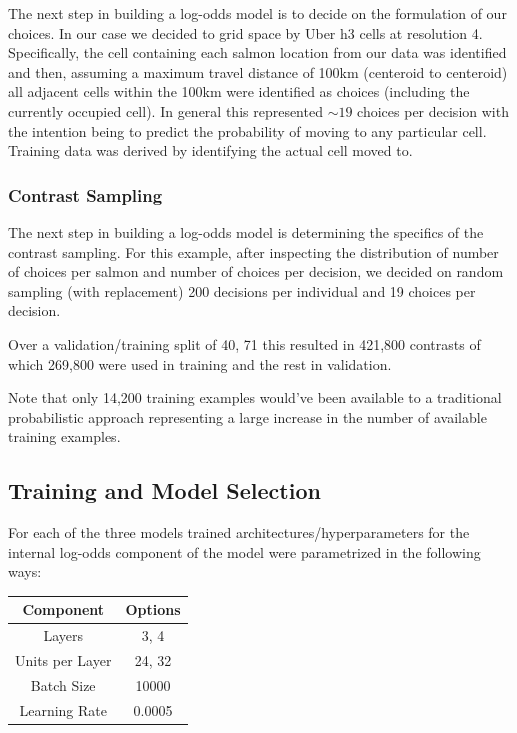 \documentclass[11pt]{article}
\begin{document}
The next step in building a log-odds model is to decide on the formulation of our choices. In our case we decided to grid space by Uber h3 cells at resolution 4. Specifically, the cell containing each salmon location from our data was identified and then, assuming a maximum travel distance of 100km (centeroid to centeroid) all adjacent cells within the 100km were identified as choices (including the currently occupied cell). In general this represented $\sim 19$ choices per decision with the intention being to predict the probability of moving to any particular cell. Training data was derived by identifying the actual cell moved to. 

\subsubsection*{Contrast Sampling}

The next step in building a log-odds model is determining the specifics of the contrast sampling. For this example, after inspecting the distribution of number of choices per salmon and number of choices per decision, we decided on random sampling (with replacement) 200 decisions per individual and 19 choices per decision. 

Over a validation/training split of 40, 71 this resulted in 421,800 contrasts of which 269,800 were used in training and the rest in validation. 

Note that only 14,200 training examples would've been available to a traditional probabilistic approach representing a large increase in the number of available training examples. 


\subsection*{Training and Model Selection}

For each of the three models trained architectures/hyperparameters for the internal log-odds component of the model were parametrized in the following ways:

\begin{center}
\begin{tabular}{| c | c |} 
\hline 
Component & Options \\
\hline
Layers & 3, 4 \\ 
Units per Layer & 24, 32 \\
Batch Size & 10000 \\
Learning Rate & 0.0005 \\
\hline
\end{tabular}
\end{center}
\end{document}
